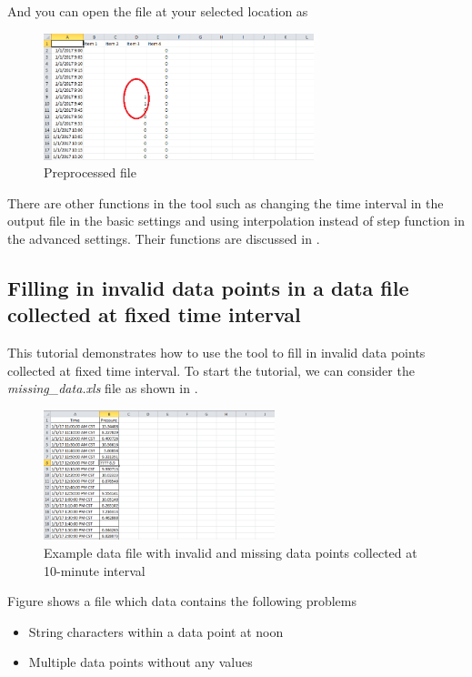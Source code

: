 \documentclass[12pt,a4paper]{article}
\begin{document}
And you can open the file at your selected location as 

\begin{figure}[H]
\centering
\includegraphics[width=0.7\textwidth]{step.png}
\caption{Preprocessed file}
\label{fig:step}
\end{figure}

There are other functions in the tool such as changing the time interval in the output file in the basic settings and using interpolation instead of step function in the advanced settings.
Their functions are discussed in .

\subsection{Filling in invalid data points in a data file collected at fixed time interval}
\label{sec:tutorial_invalid}

This tutorial demonstrates how to use the tool to fill in invalid data points collected at fixed time interval.
To start the tutorial, we can consider the \emph{missing\_data.xls} file as shown in .

\begin{figure}[H]
\centering
\includegraphics[width=0.6\textwidth]{missing_data.png}
\caption{Example data file with invalid and missing data points collected at 10-minute interval}
\label{fig:missing_data}
\end{figure}

Figure  shows a file which data contains the following problems
\begin{itemize}
\item String characters within a data point at noon
\item Multiple data points without any values
\end{itemize}
\end{document}
